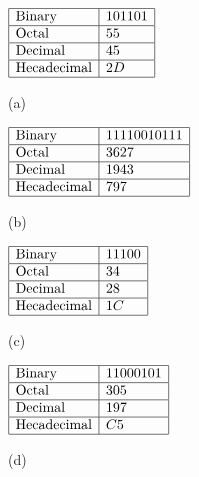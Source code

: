 \documentclass[11pt]{article} %
\newcommand{\tr}{\textrm}
\begin{document}
\begin{enumerate}
\begin{figure}[ht]
\begin{minipage}[b]{0.45\linewidth}
\centering
$\begin{array}{|l|l|}\hline
\tr{Binary} 			& 101101		\\\hline
\tr{Octal} 			& 55		\\\hline
\tr{Decimal}		& 45		\\\hline
\tr{Hecadecimal} 	& 2D		\\\hline
\end{array}$
\caption{(a)}
\label{fig:figure1}
\end{minipage}
\hspace{0.5cm}
\begin{minipage}[b]{0.45\linewidth}
\centering
$\begin{array}{|l|l|}\hline
\tr{Binary} 			& 11110010111		\\\hline
\tr{Octal} 			& 3627		\\\hline
\tr{Decimal}		& 1943		\\\hline
\tr{Hecadecimal} 	& 797		\\\hline
\end{array}$
\caption{(b)}
\label{fig:figure2}
\end{minipage}
\end{figure}

\begin{figure}[ht]
\begin{minipage}[b]{0.45\linewidth}
\centering
$\begin{array}{|l|l|}\hline
\tr{Binary} 			& 11100		\\\hline
\tr{Octal} 			& 34		\\\hline
\tr{Decimal}		& 28 		\\\hline
\tr{Hecadecimal} 	& 1C		\\\hline
\end{array}$
\caption{(c)}
\label{fig:figure1}
\end{minipage}
\hspace{0.5cm}
\begin{minipage}[b]{0.45\linewidth}
\centering
$\begin{array}{|l|l|}\hline
\tr{Binary} 			& 11000101		\\\hline
\tr{Octal} 			& 305		\\\hline
\tr{Decimal}		& 197		\\\hline
\tr{Hecadecimal} 	& C5		\\\hline
\end{array}$
\caption{(d)}
\label{fig:figure2}
\end{minipage}
\end{figure}


\end{enumerate}
\end{document}
